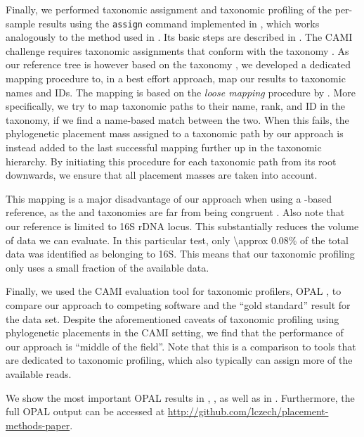 Finally, we performed taxonomic assignment and taxonomic profiling of the per-sample results
using the \texttt{assign} command implemented in ,
which works analogously to the method used in  \citep{Kozlov2016}.
Its basic steps are described in .
The CAMI challenge requires taxonomic assignments
that conform with the  taxonomy \citep{Sayers2009,Benson2009}.
As our reference tree is however based on the  taxonomy \citep{Yilmaz2014},
we developed a dedicated mapping procedure to, in a best effort approach,
map our results to  taxonomic names and IDs.
The mapping is based on the \textit{loose mapping} procedure by \cite{Balvociute2017}.
More specifically, we try to map taxonomic paths to their name, rank, and ID in the  taxonomy,
if we find a name-based match between the two.
When this fails, the phylogenetic placement mass assigned to a taxonomic path by our approach
is instead added to the last successful mapping further up in the taxonomic hierarchy.
By initiating this procedure for each taxonomic path from its root downwards,
we ensure that all placement masses are taken into account.

This mapping is a major disadvantage of our approach when using a -based reference,
as the  and  taxonomies are far from being congruent \citep{Balvociute2017}.
Also note that our reference is limited to 16S rDNA locus. This substantially reduces the volume of data we can evaluate.
In this particular test, only \num{\approx 0.08}\% of the total data was identified as belonging to 16S.
This means that our taxonomic profiling only uses a small fraction of the available data.

Finally, we used the CAMI evaluation tool for taxonomic profilers, OPAL \citep{Sczyrba2017},
to compare our approach to competing software and the ``gold standard'' result for the data set.
Despite the aforementioned caveats of taxonomic profiling using phylogenetic placements in the CAMI setting,
we find that the performance of our approach is ``middle of the field''.
Note that this is a comparison to tools that are dedicated to taxonomic profiling,
which also typically can assign more of the available reads.

We show the most important OPAL results in , ,
as well as in .
Furthermore, the full OPAL output can be accessed at \url{http://github.com/lczech/placement-methods-paper}.

